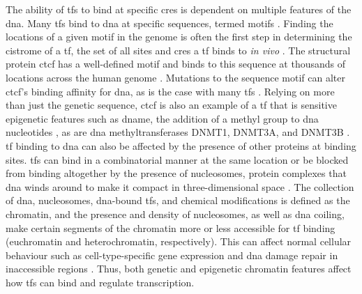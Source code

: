 The ability of \glspl{tf} to bind at specific \glspl{cre} is dependent on multiple features of the \gls{dna}.
Many \glspl{tf} bind to \gls{dna} at specific sequences, termed motifs \cite{farnhamInsightsGenomicProfiling2009,spitzTranscriptionFactorsEnhancer2012}.
Finding the locations of a given motif in the genome is often the first step in determining the cistrome of a \gls{tf}, the set of all sites and \glspl{cre} a \gls{tf} binds to \emph{in vivo} \cite{liuCistromeIntegrativePlatform2011,lupienCistromicsHormonedependentCancer2009}.
The structural protein \gls{ctcf} has a well-defined motif and binds to this sequence at thousands of locations across the human genome \cite{kimAnalysisVertebrateInsulator2007,dixonTopologicalDomainsMammalian2012}.
Mutations to the sequence motif can alter \gls{ctcf}'s binding affinity for \gls{dna}, as is the case with many \glspl{tf} \cite{kasowskiVariationTranscriptionFactor2010,mauranoWidespreadSitedependentBuffering2012,mauranoLargescaleIdentificationSequence2015}.
Relying on more than just the genetic sequence, \Gls{ctcf} is also an example of a \gls{tf} that is sensitive epigenetic features such as \gls{dname}, the addition of a methyl group to \gls{dna} nucleotides \cite{mauranoRoleDNAMethylation2015,wangWidespreadPlasticityCTCF2012,wiehleDNAMethylationEmbryonic2019,xuNascentDNAMethylome2018,vinerModelingMethylsensitiveTranscription2016}, as are \gls{dna} methyltransferases DNMT1, DNMT3A, and DNMT3B \cite{gollEukaryoticCytosineMethyltransferases2005,listerHumanDNAMethylomes2009}.
\Gls{tf} binding to \gls{dna} can also be affected by the presence of other proteins at binding sites.
\Glspl{tf} can bind in a combinatorial manner at the same location \cite{farnhamInsightsGenomicProfiling2009,ongEnhancerFunctionNew2011,spitzTranscriptionFactorsEnhancer2012} or be blocked from binding altogether by the presence of nucleosomes, protein complexes that \gls{dna} winds around to make it compact in three-dimensional space \cite{henikoffNucleosomeDestabilizationEpigenetic2008,jiangNucleosomePositioningGene2009}.
The collection of \gls{dna}, nucleosomes, \gls{dna}-bound \glspl{tf}, and chemical modifications is defined as the chromatin, and the presence and density of nucleosomes, as well as \gls{dna} coiling, make certain segments of the chromatin more or less accessible for \gls{tf} binding (euchromatin and heterochromatin, respectively).
This can affect normal cellular behaviour such as cell-type-specific gene expression \cite{vierstraGlobalReferenceMapping2020,cusanovichSingleCellAtlasVivo2018} and \gls{dna} damage repair in inaccessible regions \cite{polakCelloforiginChromatinOrganization2015}.
Thus, both genetic and epigenetic chromatin features affect how \glspl{tf} can bind and regulate transcription.

